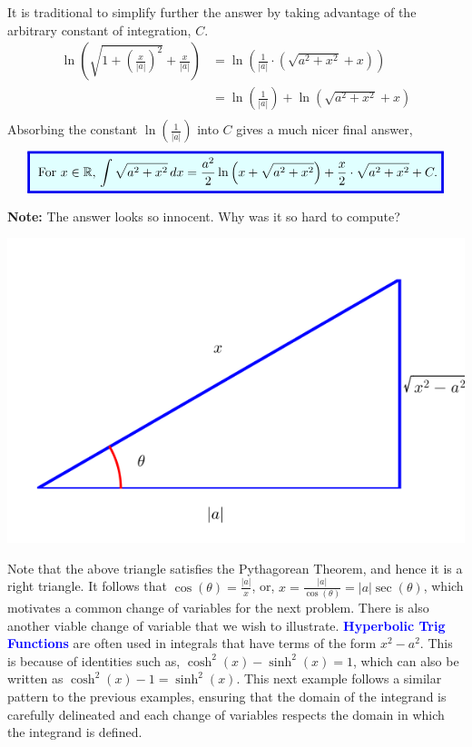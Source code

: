 It is traditional to simplify further the answer by taking advantage of the arbitrary constant of integration, $C$.
\begin{align*}
  \ln\left(\sqrt{1 + \left(\frac{x}{|a|}\right)^2} + \frac{x}{|a|}\right)  &= \ln\left( \frac{1}{|a|} \cdot \left( \sqrt{a^2 + x^2 } + x \right) \right)\\[1em]
 & = \ln \left( \frac{1}{|a|} \right) + \ln \left( \sqrt{a^2 + x^2 } + x \right) \\[1em]
\end{align*}
Absorbing the constant $\ln \left( \frac{1}{|a|} \right)$ into $C$ gives a much nicer final answer, 
\[
\setlength{\fboxrule}{2pt} %
\fcolorbox{brightblue}{lightblue}{%
\addtolength{\fboxsep}{5pt} %
For $x\in \real$, $\displaystyle
\int \sqrt{a^2 + x^2} \, dx =  \frac{a^2}{2}\ln \left(x +  \sqrt{a^2 + x^2 } \right) +   \frac{x}{2} \cdot \sqrt{a^2 + x^2} +C.
$%
}
\]


\textbf{Note:} The answer looks so innocent. Why was it so hard to compute? 

\Qed



\begin{center}
    \includegraphics[width=0.6\columnwidth]{graphics/Chap07/TrigSubSqRtXsqMinusAsq.png}
\end{center}

Note that the above triangle satisfies the Pythagorean Theorem, and hence it is a right triangle. It follows that $\cos(\theta) =  \frac{|a|}{x}$, or, $x = \frac{|a|}{\cos(\theta)} = |a| \sec(\theta)$, which motivates a common change of variables for the next problem. There is also another viable change of variable that we wish to illustrate. \textcolor{blue}{\bf Hyperbolic Trig Functions} are often used in integrals that have terms of the form \( x^2 - a^2 \). This is because of identities such as, $\cosh^2(x) - \sinh^2(x) = 1$, which can also be written as $\cosh^2(x) - 1 = \sinh^2(x)$. This next example follows a similar pattern to the previous examples, ensuring that the domain of the integrand is carefully delineated and each change of variables respects the domain in which the integrand is defined.

